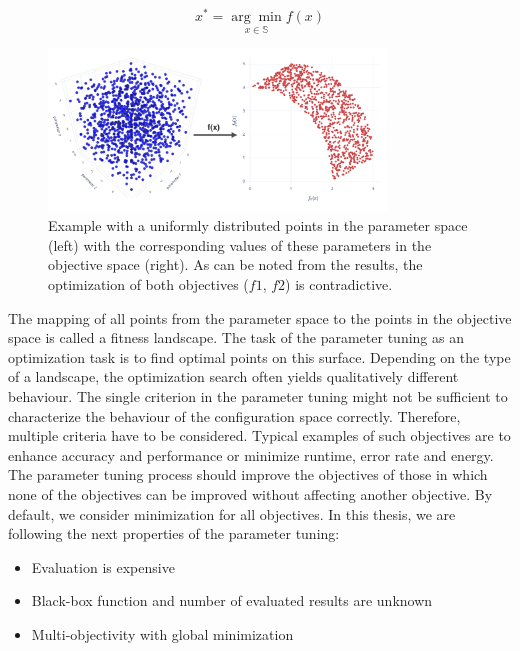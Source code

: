                 \begin{equation} \label{eq:arg_min}
                    x^* = \underset{x \in \mathbb{S}}{\arg\min} f(x)
                \end{equation}

        \begin{figure}
            \centering 
            \includegraphics[width=0.8\textwidth]{content/images/utility/spaces}
            \caption[Example with a uniformly distributed points in the parameter space (left) with the corresponding values of these parameters in the objective space]{Example with a uniformly distributed points in the parameter space (left) with the corresponding values of these parameters in the objective space (right). As can be noted from the results, the optimization of both objectives ($f1$, $f2$) is contradictive.} 
            \label{fig:spaces} 
        \end{figure}

        The mapping of all points from the parameter space to the points in the objective space is called a fitness landscape. The task of the parameter tuning as an optimization task is to find optimal points on this surface. Depending on the type of a landscape, the optimization search often yields qualitatively different behaviour.
        The single criterion in the parameter tuning might not be sufficient to characterize the behaviour of the configuration space correctly. Therefore, multiple criteria have to be considered. Typical examples of such objectives are to enhance accuracy and performance or minimize runtime, error rate and energy. The parameter tuning process should improve the objectives of those in which none of the objectives can be improved without affecting another objective. By default, we consider minimization for all objectives. 
        In this thesis, we are following the next properties of the parameter tuning:
        \begin{itemize}
            \item Evaluation is expensive
            \item Black-box function and number of evaluated results are unknown
            \item Multi-objectivity with global minimization
        \end{itemize}

